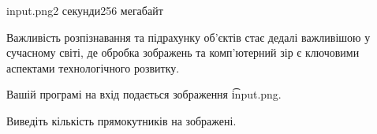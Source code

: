 \begin{problem}{}{input.png}{}{2 секунди}{256 мегабайт}

Важливість розпізнавання та підрахунку об'єктів стає дедалі важливішою у сучасному світі, 
де обробка зображень та комп'ютерний зір є ключовими аспектами технологічного розвитку.



\InputFile
Вашій програмі на вхід подається зображення  \t{input.png}.  

\OutputFile
Виведіть кількість прямокутників на зображені.

\Constraints


\Examples
\begin{example}
%
\end{example}

\end{problem}


